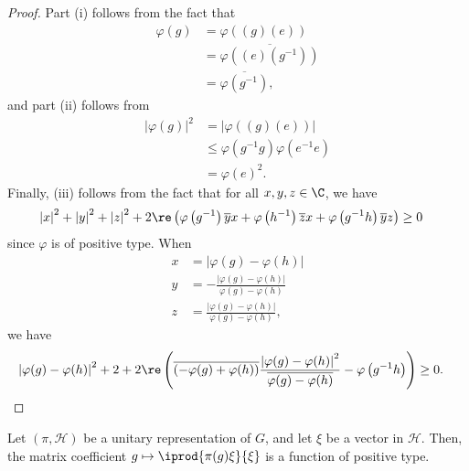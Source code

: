 \documentclass[10pt]{mypackage}
\begin{document}
\begin{proof}
  Part (i) follows from the fact that 
  \begin{align*}
    \varphi\left( g \right) &= \varphi\left( (g)(e) \right)\\
                            &= \overline{\varphi\left( (e)\left( g^{-1} \right) \right)}\\
                            &= \overline{\varphi\left( g^{-1} \right)},
  \end{align*}
  and part (ii) follows from
  \begin{align*}
    \left\vert \varphi\left( g \right) \right\vert^2 &= \left\vert \varphi\left( (g)(e) \right) \right\vert\\
                                                     &\leq \varphi\left( g^{-1}g \right)\varphi\left( e^{-1}e \right)\\
                                                     &= \varphi\left( e \right)^2.
  \end{align*}
  Finally, (iii) follows from the fact that for all $x,y,z\in \C$, we have
  \begin{align*}
    \left\vert x \right\vert^2 + \left\vert y \right\vert^2 + \left\vert z \right\vert^2 + 2\re \left( \varphi\left( g^{-1} \right) \overline{y}x + \varphi\left( h^{-1} \right) \overline{z}x + \varphi\left( g^{-1}h \right) \overline{y}z \right) &\geq 0
  \end{align*}
  since $\varphi$ is of positive type. When 
  \begin{align*}
    x &= \left\vert \varphi(g)-\varphi(h) \right\vert\\
    y &= - \frac{\left\vert \varphi(g)-\varphi(h) \right\vert}{\varphi(g)-\varphi(h)}\\
    z &= \frac{\left\vert \varphi(g)-\varphi(h) \right\vert}{\varphi(g)-\varphi(h)},
  \end{align*}
  we have
  \begin{align*}
    \left\vert \varphi(g)-\varphi(h) \right\vert^2 + 2 + 2\re\left( \overline{\left( -\varphi(g) + \varphi(h) \right)}\frac{\left\vert \varphi(g)-\varphi(h) \right\vert^2}{ \overline{\varphi(g)-\varphi(h)} }-\varphi\left( g^{-1}h \right) \right) &\geq 0.
  \end{align*}
\end{proof}
\begin{proposition}
  Let $\left( \pi, \mathscr{H} \right)$ be a unitary representation of $G$, and let $\xi$ be a vector in $ \mathscr{H} $. Then, the matrix coefficient $g\mapsto \iprod{\pi(g)\xi}{\xi}$ is a function of positive type.
\end{proposition}
\end{document}

